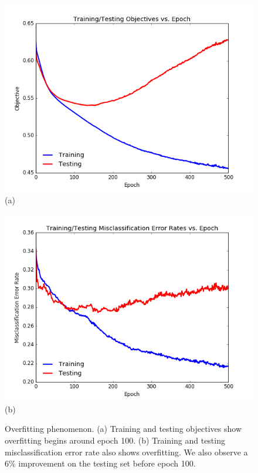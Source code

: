 \documentclass[paper=a4, fontsize=11pt]{scrartcl}
\begin{document}
\begin{figure}
\centering
\centering
 \begin{minipage}{.5\columnwidth}
\centering
  	\includegraphics[width=1\linewidth]{overfit_objective.png}
  	\footnotesize{(a)}
 \end{minipage}\hfill%
\centering
 \begin{minipage}{.5\columnwidth}
\centering
  	\includegraphics[width=1\columnwidth]{overfit_errorrate.png}
  	\footnotesize{(b)}
 \end{minipage}\hfill%
\caption{Overfitting phenomenon. (a) Training and testing objectives show overfitting begins around epoch 100.  (b) Training and testing misclassification error rate also shows overfitting.  We also observe a 6\% improvement on the testing set before epoch 100.}
\label{fig:overfit}
\end{figure}
\end{document}

